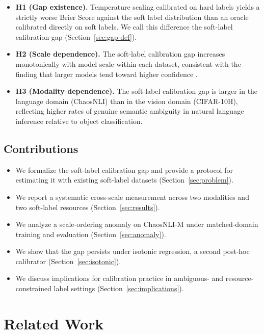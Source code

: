 \documentclass[11pt,a4paper]{article}
\theoremstyle{definition}
\begin{document}
\begin{itemize}
  \item \textbf{H1 (Gap existence).}
  Temperature scaling calibrated on hard labels yields a strictly worse
  Brier Score against the soft label distribution than an oracle
  calibrated directly on soft labels. We call this difference the
  soft-label calibration gap (Section~\ref{sec:gap-def}).

  \item \textbf{H2 (Scale dependence).}
  The soft-label calibration gap increases monotonically with model scale
  within each dataset, consistent with the finding that larger models
  tend toward higher confidence \cite{Guo2017}.

  \item \textbf{H3 (Modality dependence).}
  The soft-label calibration gap is larger in the language domain
  (ChaosNLI) than in the vision domain (CIFAR-10H), reflecting higher
  rates of genuine semantic ambiguity in natural language inference
  relative to object classification.
\end{itemize}

\subsection{Contributions}

\begin{itemize}
  \item We formalize the soft-label calibration gap and provide a
  protocol for estimating it with existing soft-label datasets
  (Section~\ref{sec:problem}).
  \item We report a systematic cross-scale measurement across two
  modalities and two soft-label resources (Section~\ref{sec:results}).
  \item We analyze a scale-ordering anomaly on ChaosNLI-M under
  matched-domain training and evaluation (Section~\ref{sec:anomaly}).
  \item We show that the gap persists under isotonic regression, a
  second post-hoc calibrator (Section~\ref{sec:isotonic}).
  \item We discuss implications for calibration practice in ambiguous-
  and resource-constrained label settings (Section~\ref{sec:implications}).
\end{itemize}

\section{Related Work}
\end{document}
